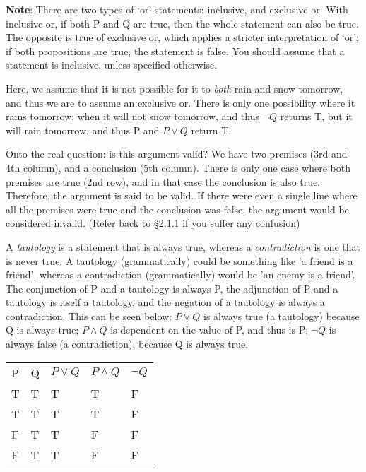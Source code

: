 \documentclass[a4paper, 11pt]{article}
\begin{document}
\textbf{Note}: There are two types of `or' statements: inclusive, and exclusive or. With inclusive or, if both P and Q are true, then the whole statement can also be true. The opposite is true of exclusive or, which applies a stricter interpretation of `or'; if both propositions are true, the statement is false. You should assume that a statement is inclusive, unless specified otherwise.

Here, we assume that it is not possible for it to \textit{both} rain and snow tomorrow, and thus we are to assume an exclusive or. There is only one possibility where it rains tomorrow: when it will not snow tomorrow, and thus $\neg Q$ returns T, but it will rain tomorrow, and thus P and $P \vee Q$ return T.

Onto the real question: is this argument valid? We have two premises (3rd and 4th column), and a conclusion (5th column). There is only one case where both premises are true (2nd row), and in that case the conclusion is also true. Therefore, the argument is said to be valid. If there were even a single line where all the premises were true and the conclusion was false, the argument would be considered invalid. (Refer back to \S 2.1.1 if you suffer any confusion)

A \textit{tautology} is a statement that is always true, whereas a \textit{contradiction} is one that is never true. A tautology (grammatically) could be something like 'a friend is a friend', whereas a contradiction (grammatically) would be 'an enemy is a friend'. The conjunction of P and a tautology is always P, the adjunction of P and a tautology is itself a tautology, and the negation of a tautology is always a contradiction. This can be seen below: $P \vee Q$ is always true (a tautology) because Q is always true; $P \wedge Q$ is dependent on the value of P, and thus is P; $\neg Q$ is always false (a contradiction), because Q is always true.

\begin{table}[htbp]
  \centering
  \begin{tabular}{lllll}
    P & Q & $P \vee Q$ & $P \wedge Q$ & $\neg Q$ \\
    T & T & T          & T            & F        \\
    T & T & T          & T            & F        \\
    F & T & T          & F            & F        \\
    F & T & T          & F            & F        \\
  \end{tabular}
\end{table}
\end{document}
